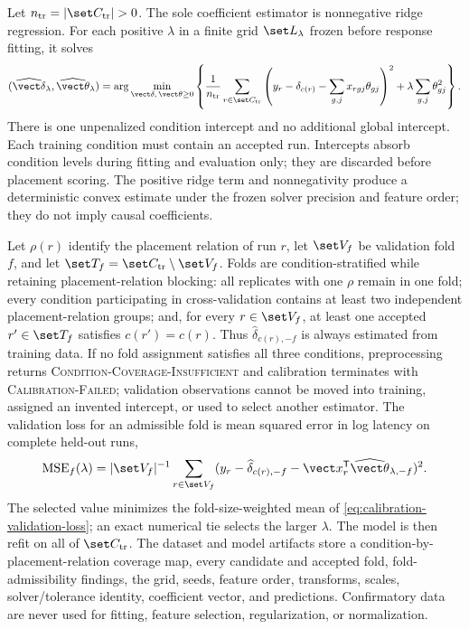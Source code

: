 Let $n_{\mathrm{tr}}=|\set C_{\mathrm{tr}}|>0$. The sole coefficient estimator is nonnegative ridge regression. For each positive $\lambda$ in a finite grid $\set L_\lambda$ frozen before response fitting, it solves
\begin{equation}
 (\widehat{\vect\delta}_\lambda,\widehat{\vect\theta}_\lambda)
 =\arg\min_{\vect\delta,\,\vect\theta\geq0}
 \left\{
 \frac{1}{n_{\mathrm{tr}}}
 \sum_{r\in\set C_{\mathrm{tr}}}
 \left(y_r-\delta_{c(r)}-\sum_{g,j}x_{rgj}\theta_{gj}\right)^2
 +\lambda\sum_{g,j}\theta_{gj}^2
 \right\}.
 \label{eq:nonnegative-ridge}
\end{equation}
There is one unpenalized condition intercept and no additional global intercept. Each training condition must contain an accepted run. Intercepts absorb condition levels during fitting and evaluation only; they are discarded before placement scoring. The positive ridge term and nonnegativity produce a deterministic convex estimate under the frozen solver precision and feature order; they do not imply causal coefficients.

Let $\rho(r)$ identify the placement relation of run $r$, let $\set V_f$ be validation fold $f$, and let $\set T_f=\set C_{\mathrm{tr}}\setminus\set V_f$. Folds are condition-stratified while retaining placement-relation blocking: all replicates with one $\rho$ remain in one fold; every condition participating in cross-validation contains at least two independent placement-relation groups; and, for every $r\in\set V_f$, at least one accepted $r'\in\set T_f$ satisfies $c(r')=c(r)$. Thus $\widehat\delta_{c(r),-f}$ is always estimated from training data. If no fold assignment satisfies all three conditions, preprocessing returns \textsc{Condition-Coverage-Insufficient} and calibration terminates with \textsc{Calibration-Failed}; validation observations cannot be moved into training, assigned an invented intercept, or used to select another estimator. The validation loss for an admissible fold is mean squared error in log latency on complete held-out runs,
\begin{equation}
 \operatorname{MSE}_f(\lambda)=|\set V_f|^{-1}
 \sum_{r\in\set V_f}(y_r-\widehat\delta_{c(r),-f}
 -\vect x_r^{\mathsf T}\widehat{\vect\theta}_{\lambda,-f})^2.
 \label{eq:calibration-validation-loss}
\end{equation}
The selected value minimizes the fold-size-weighted mean of \cref{eq:calibration-validation-loss}; an exact numerical tie selects the larger $\lambda$. The model is then refit on all of $\set C_{\mathrm{tr}}$. The dataset and model artifacts store a condition-by-placement-relation coverage map, every candidate and accepted fold, fold-admissibility findings, the grid, seeds, feature order, transforms, scales, solver/tolerance identity, coefficient vector, and predictions. Confirmatory data are never used for fitting, feature selection, regularization, or normalization.

